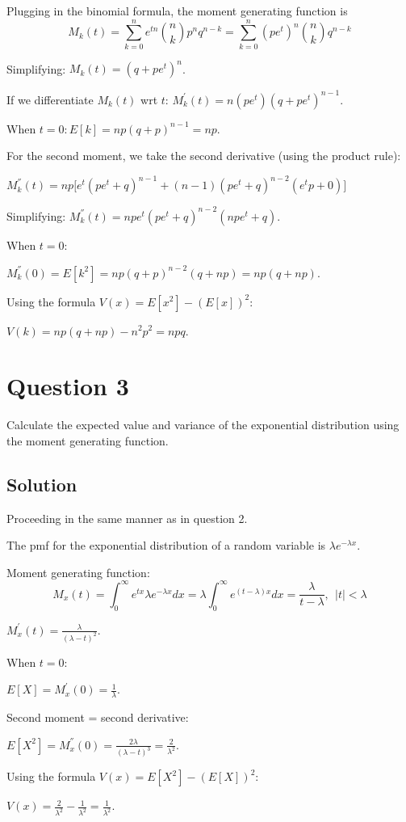 \documentclass[]{article}
\begin{document}
Plugging in the binomial formula, the moment generating function is
\[M_k(t) = \sum_{k=0}^{n}e^{tn}\binom{n}{k}p^{n}q^{n-k} = \sum_{k=0}^{n}(pe^t)^{n}\binom{n}{k}q^{n-k}\]

Simplifying: \(M_k(t) = (q + pe^t)^n\).

If we differentiate \(M_k(t)\) wrt \(t\):
\(M_{k}^{'}(t) = n(pe^t)(q+pe^t)^{n-1}\).

When \(t = 0: E[k] = np(q+p)^{n-1} = np\).

For the second moment, we take the second derivative (using the product
rule):

\(M_k^{''}(t) = np\Big[e^{t}(pe^t + q)^{n-1}+(n-1)(pe^t + q)^{n-2}(e^tp + 0)\Big]\)

Simplifying: \(M_k^{''}(t) = npe^t(pe^t + q)^{n-2}(npe^t + q)\).

When \(t = 0:\)

\(M_k^{''}(0) = E[k^2] = np(q + p)^{n-2}(q + np) = np(q + np)\).

Using the formula \(V(x) = E[x^2] - (E[x])^2:\)

\(V(k) = np(q + np) - n^2p^2 = npq\).

\section{Question 3}\label{question-3}

Calculate the expected value and variance of the exponential
distribution using the moment generating function.

\subsection{Solution}\label{solution-2}

Proceeding in the same manner as in question 2.

The pmf for the exponential distribution of a random variable is
\(\lambda e^{-\lambda x}\).

Moment generating function:
\[M_x(t) = \int_{0}^{\infty}e^{tx}\lambda e^{-\lambda x} dx = \lambda \int_{0}^{\infty}e^{(t-\lambda)x} dx = \frac{\lambda}{t - \lambda}, \ \ |t| < \lambda\]

\(M_{x}^{'}(t) = \frac{\lambda}{(\lambda - t)^2}\).

When \(t = 0:\)

\(E[X] = M_{x}^{'}(0) = \frac{1}{\lambda}\).

Second moment = second derivative:

\(E[X^2] = M_{x}^{''}(0) = \frac{2\lambda}{(\lambda - t)^3} = \frac{2}{\lambda^2}\).

Using the formula \(V(x) = E[X^2] - (E[X])^2:\)

\(V(x) = \frac{2}{\lambda^2} - \frac{1}{\lambda^2} = \frac{1}{\lambda^2}\).
\end{document}
